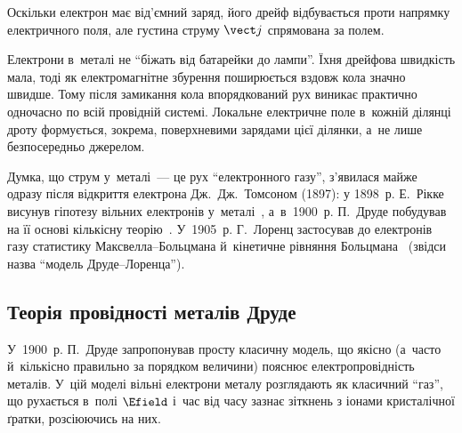 Оскільки електрон має від'ємний заряд, його дрейф відбувається проти напрямку електричного
поля, але густина струму $\vect j$ спрямована за полем.

\begin{Attention}
	Електрони в~металі не \enquote{біжать від батарейки до лампи}. Їхня дрейфова швидкість
	мала, тоді як електромагнітне збурення поширюється вздовж кола значно швидше. Тому після
	замикання кола впорядкований рух виникає практично одночасно по всій провідній системі.
	Локальне електричне поле в~кожній ділянці дроту формується, зокрема, поверхневими
	зарядами цієї ділянки, а~не лише безпосередньо джерелом.
\end{Attention}

\begin{Historical}
	Думка, що струм у~металі~--- це рух \enquote{електронного газу}, з'явилася майже
	одразу після відкриття електрона Дж.~Дж.~Томсоном (1897): у 1898~р. Е.~Рікке
	висунув гіпотезу вільних електронів у~металі~\cite{Riecke1901}, а~в~1900~р. П.~Друде побудував на її основі
	кількісну теорію~\cite{Drude1900}. У~1905~р. Г.~Лоренц застосував до електронів газу статистику\linebreak
	Максвелла--Больц\-ма\-на й~кінетичне рівняння Больцмана~\cite{Lorentz1905Metals} (звідси назва
	\enquote{модель Друде--Лоренца}).
\end{Historical}


\subsection*{Теорія провідності металів Друде}


У~1900~р. П.~Друде запропонував просту класичну модель, що якісно (а~часто й~кількісно
правильно за порядком величини) пояснює електропровідність металів. У~цій моделі вільні
електрони металу розглядають як класичний \enquote{газ}, що рухається в~полі $\Efield$
і~час від часу зазнає зіткнень з іонами кристалічної ґратки, розсіюючись на них.


